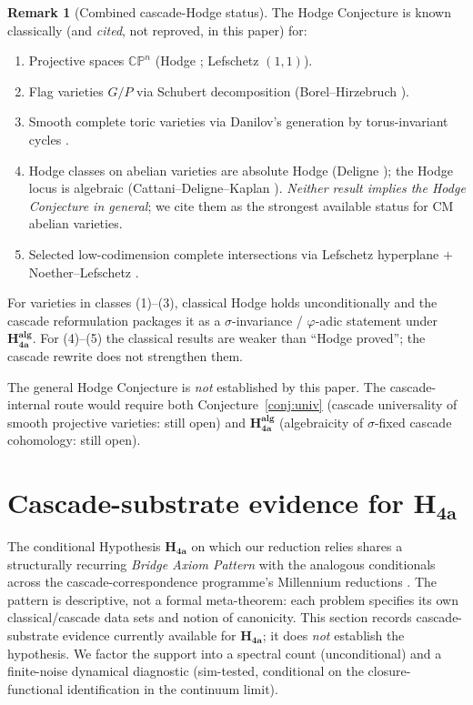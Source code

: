 \documentclass[11pt, a4paper]{amsart}
\theoremstyle{definition}
\newtheorem{remark}[theorem]{Remark}
\newcommand{\CP}{\mathbb{CP}}
\newcommand{\pphi}{\varphi}
\begin{document}
\begin{remark}[Combined cascade-Hodge status]\label{rmk:combined}
The Hodge Conjecture is known classically (and \emph{cited}, not
reproved, in this paper) for:
\begin{enumerate}
\item Projective spaces $\CP^n$ (Hodge \cite{Hodge1941};
   Lefschetz $(1,1)$).
\item Flag varieties $G/P$ via Schubert decomposition
   (Borel--Hirzebruch \cite{BorelHirzebruch}).
\item Smooth complete toric varieties via Danilov's generation by
   torus-invariant cycles \cite{Danilov}.
\item Hodge classes on abelian varieties are absolute Hodge
   (Deligne \cite{Deligne1982}); the Hodge locus is algebraic
   (Cattani--Deligne--Kaplan \cite{CDK}). \emph{Neither result
   implies the Hodge Conjecture in general}; we cite them as the
   strongest available status for CM abelian varieties.
\item Selected low-codimension complete intersections via Lefschetz
   hyperplane $+$ Noether--Lefschetz \cite{NoetherLefschetz}.
\end{enumerate}
For varieties in classes (1)--(3), classical Hodge holds
unconditionally and the cascade reformulation packages it as a
$\sigma$-invariance / $\pphi$-adic statement under
$\mathbf{H_{4a}^{alg}}$. For (4)--(5) the classical results are
weaker than ``Hodge proved''; the cascade rewrite does not
strengthen them.

The general Hodge Conjecture is \emph{not} established by this paper.
The cascade-internal route would require both
Conjecture~\ref{conj:univ} (cascade universality of smooth
projective varieties: still open) and $\mathbf{H_{4a}^{alg}}$
(algebraicity of $\sigma$-fixed cascade cohomology: still open).
\end{remark}

\section{Cascade-substrate evidence for $\mathbf{H_{4a}}$}\label{sec:attractor_support}

The conditional Hypothesis $\mathbf{H_{4a}}$ on which our reduction
relies shares a structurally recurring \emph{Bridge Axiom Pattern}
with the analogous conditionals across the cascade-correspondence
programme's Millennium reductions
\cite{ConvergenceWithSmart, CascadeRHformal}.  The pattern is
descriptive, not a formal meta-theorem: each problem specifies its
own classical/cascade data sets and notion of canonicity.  This
section records cascade-substrate evidence currently available for
$\mathbf{H_{4a}}$; it does \emph{not} establish the hypothesis.
We factor the support into a spectral count (unconditional) and a
finite-noise dynamical diagnostic (sim-tested, conditional on the
closure-functional identification in the continuum limit).
\end{document}
